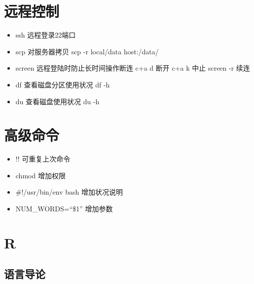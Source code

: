 \documentclass[
]{book}
\providecommand{\tightlist}{%
  \setlength{\itemsep}{0pt}\setlength{\parskip}{0pt}}
\begin{document}
\hypertarget{ux8fdcux7a0bux63a7ux5236}{%
\section{远程控制}\label{ux8fdcux7a0bux63a7ux5236}}

\begin{itemize}
\tightlist
\item
  ssh 远程登录22端口
\item
  scp 对服务器拷贝 scp -r local/data host:/data/
\item
  screen 远程登陆时防止长时间操作断连 c+a d 断开 c+a k 中止 screen -r 续连
\item
  df 查看磁盘分区使用状况 df -h
\item
  du 查看磁盘使用状况 du -h
\end{itemize}

\hypertarget{ux9ad8ux7ea7ux547dux4ee4}{%
\section{高级命令}\label{ux9ad8ux7ea7ux547dux4ee4}}

\begin{itemize}
\item
  !! 可重复上次命令
\item
  chmod 增加权限
\item
  \#!/usr/bin/env bash 增加状况说明
\item
  NUM\_WORDS=``\$1'' 增加参数
\end{itemize}

\hypertarget{r}{%
\section{R}\label{r}}

\hypertarget{ux8bedux8a00ux5bfcux8bba}{%
\subsection{语言导论}\label{ux8bedux8a00ux5bfcux8bba}}
\end{document}
